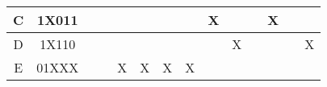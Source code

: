 \documentclass[12pt,a4paper]{report}
\begin{document}
\begin{tabular}{|c|c|c|c|c|c|c|c|c|c|c|c|c|c|}
    \cellcolor[HTML]{FFCCC9}C & \cellcolor[HTML]{FFCCC9}1X011 &                                                                                   &                                                                                   &                                                                                   & \cellcolor[HTML]{FFCCC9}                                  &                                                                                   &                                                                                   & X                                                                                 &                                                                                   &                                                                                   & X                                                                                 &                                                                                   &                                                                                   \\ \hline
    \rowcolor[HTML]{FFFFC7} 
    \cellcolor[HTML]{FFCCC9}D & \cellcolor[HTML]{FFCCC9}1X110 &                                                                                   &                                                                                   &                                                                                   & \cellcolor[HTML]{FFCCC9}                                  &                                                                                   &                                                                                   &                                                                                   & X                                                                                 &                                                                                   &                                                                                   &                                                                                   & X                                                                                 \\ \hline
    E                         & 01XXX                         & \cellcolor[HTML]{9AFF99}                                                          & \cellcolor[HTML]{9AFF99}                                                          & \cellcolor[HTML]{9AFF99}X                                                         & X                                                         & \cellcolor[HTML]{9AFF99}X                                                         & \cellcolor[HTML]{9AFF99}X                                                         & \cellcolor[HTML]{9AFF99}                                                          & \cellcolor[HTML]{9AFF99}                                                          & \cellcolor[HTML]{9AFF99}                                                          & \cellcolor[HTML]{9AFF99}                                                          & \cellcolor[HTML]{9AFF99}                                                          & \cellcolor[HTML]{9AFF99}                                                          \\ \hline

\end{tabular}
\end{document}
